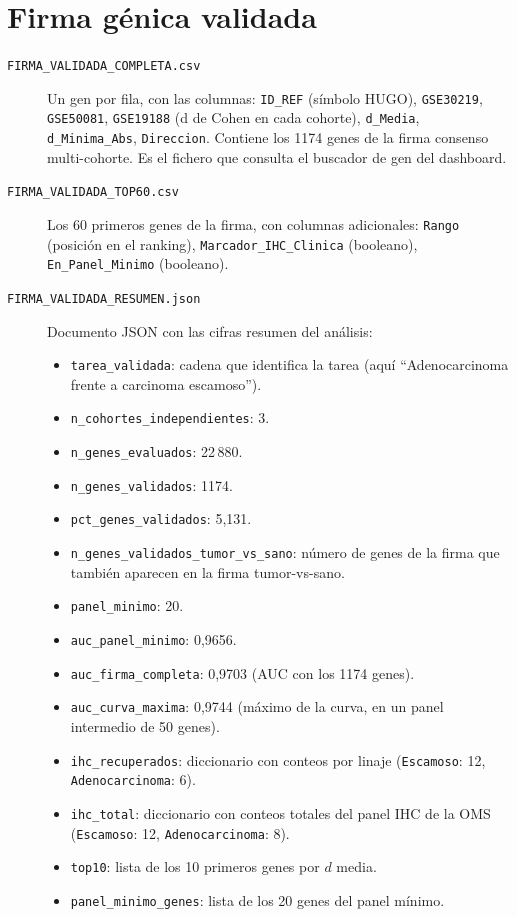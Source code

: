 \section*{Firma génica validada}
{}

\begin{description}
  \item[\texttt{FIRMA\_VALIDADA\_COMPLETA.csv}] Un gen por fila, con las
  columnas: \texttt{ID\_REF} (símbolo HUGO), \texttt{GSE30219},
  \texttt{GSE50081}, \texttt{GSE19188} (d de Cohen en cada cohorte),
  \texttt{d\_Media}, \texttt{d\_Minima\_Abs}, \texttt{Direccion}. Contiene
  los 1174 genes de la firma consenso multi-cohorte. Es el fichero que
  consulta el buscador de gen del dashboard.

  \item[\texttt{FIRMA\_VALIDADA\_TOP60.csv}] Los 60 primeros genes de la
  firma, con columnas adicionales: \texttt{Rango} (posición en el
  ranking), \texttt{Marcador\_IHC\_Clinica} (booleano),
  \texttt{En\_Panel\_Minimo} (booleano).

  \item[\texttt{FIRMA\_VALIDADA\_RESUMEN.json}] Documento JSON con las
  cifras resumen del análisis:
  \begin{itemize}
    \item \texttt{tarea\_validada}: cadena que identifica la tarea (aquí
    ``Adenocarcinoma frente a carcinoma escamoso'').
    \item \texttt{n\_cohortes\_independientes}: 3.
    \item \texttt{n\_genes\_evaluados}: 22\,880.
    \item \texttt{n\_genes\_validados}: 1174.
    \item \texttt{pct\_genes\_validados}: 5,131.
    \item \texttt{n\_genes\_validados\_tumor\_vs\_sano}: número de genes
    de la firma que también aparecen en la firma tumor-vs-sano.
    \item \texttt{panel\_minimo}: 20.
    \item \texttt{auc\_panel\_minimo}: 0,9656.
    \item \texttt{auc\_firma\_completa}: 0,9703 (AUC con los 1174 genes).
    \item \texttt{auc\_curva\_maxima}: 0,9744 (máximo de la curva, en un
    panel intermedio de 50 genes).
    \item \texttt{ihc\_recuperados}: diccionario con conteos por linaje
    (\texttt{Escamoso}: 12, \texttt{Adenocarcinoma}: 6).
    \item \texttt{ihc\_total}: diccionario con conteos totales del panel
    IHC de la OMS (\texttt{Escamoso}: 12, \texttt{Adenocarcinoma}: 8).
    \item \texttt{top10}: lista de los 10 primeros genes por $d$ media.
    \item \texttt{panel\_minimo\_genes}: lista de los 20 genes del panel
    mínimo.
  \end{itemize}


\end{description}
